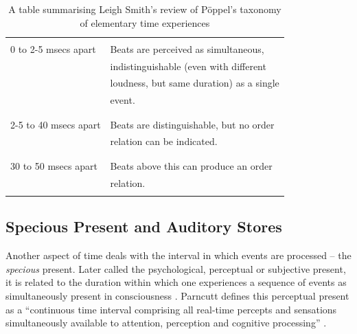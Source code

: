 \begin{table}
\begin{tabular}{|l|l|}\hline %
& \\
0 to 2-5 msecs apart   & Beats are perceived as simultaneous, \\
                       & indistinguishable (even with different \\
                       & loudness, but same duration) as a single\\
                       & event. \\
                       & \\ \hline
                       & \\

2-5 to 40 msecs apart  & Beats are distinguishable, but no order \\
                       & relation can be indicated. \\
                       & \\ \hline
                       &  \\

30 to 50 msecs apart   & Beats above this can produce an order \\
                       & relation. \\
                       & \\ \hline
\end{tabular}
\caption {A table summarising Leigh Smith's review of P{\"o}ppel's
 taxonomy of elementary time experiences \cite[p. 14]{Smith:99} }
\end{table}

\vspace{5mm}
\subsection{Specious Present and Auditory Stores}

Another aspect of time deals with the interval in which
events are processed -- the {\it specious} present. Later called the 
psychological, perceptual or subjective present, it is related to the 
duration within which one experiences a sequence of events as
simultaneously present in consciousness \cite[p. 97]{Gabrielsson:89}\cite{Fraisse:63}.
Parncutt defines this perceptual present as a ``continuous time
interval comprising all real-time percepts and sensations
simultaneously available to attention, perception and cognitive 
processing'' \cite[p. 451]{Parncutt:94}\cite[p. 12]{Smith:99}.

